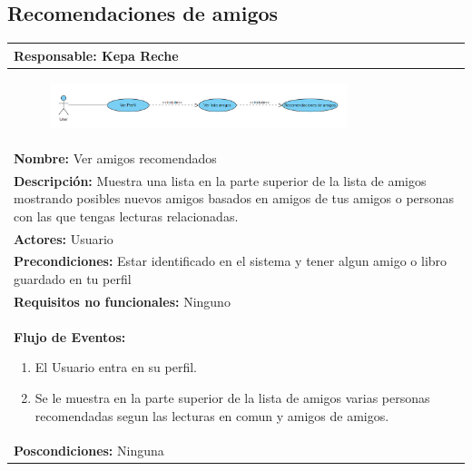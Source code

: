 \documentclass{report}
\begin{document}
        \subsection{Recomendaciones de amigos}
                    \begin{center}
                \begin{longtable}{|p{\linewidth}|}
                    \hline
                    \textbf{Responsable:} Kepa Reche\\
                    \hline
                    \begin{figure}[H]
                        \centering
                        \includegraphics[width=0.8\textwidth]{./img/casos_uso/CasosDeUsoRecomendacionDeAmigos.PNG}
                    \end{figure}\\
                    \hline
                    \textbf{Nombre:} Ver amigos recomendados\\
                    \hline
                    \textbf{Descripción:} Muestra una lista en la parte superior de la lista de amigos mostrando posibles nuevos amigos basados en amigos de tus amigos o personas con las que tengas lecturas relacionadas.\\
                    \hline
                    \textbf{Actores:} Usuario\\
                    \hline
                    \textbf{Precondiciones:} Estar identificado en el sistema y tener algun amigo o libro guardado en tu perfil\\
                    \hline
                    \textbf{Requisitos no funcionales:} Ninguno\\
                    \hline
                    \textbf{Flujo de Eventos:}
                    \begin{enumerate}
                        \item El Usuario entra en su perfil.
                        \item Se le muestra en la parte superior de la lista de amigos varias personas recomendadas segun las lecturas en comun y amigos de amigos.
                    \end{enumerate}\\
                    \hline
                    \textbf{Poscondiciones:} Ninguna\\

\end{longtable}
\end{center}
\end{document}

